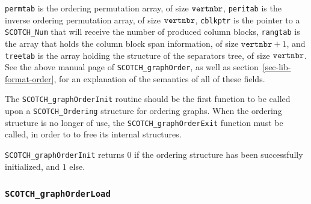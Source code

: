\begin{itemize}
{\tt permtab} is the ordering permutation array, of size ${\tt
vertnbr}$, {\tt peritab} is the inverse ordering permutation array,
of size ${\tt vertnbr}$, {\tt cblkptr} is the pointer to a
{\tt SCOTCH\_\lbt Num} that will receive the number of produced
column blocks, {\tt rangtab} is the array that holds the column block
span information, of size $\mathtt{vertnbr} + 1$, and {\tt treetab}
is the array holding the structure of the separators tree, of size
${\tt vertnbr}$. See the above manual page of
{\tt SCOTCH\_graph\lbt Order}, as well as
section~\ref{sec-lib-format-order}, for an explanation of the
semantics of all of these fields.

The {\tt SCOTCH\_\lbt graph\lbt Order\lbt Init} routine should be the
first function to be called upon a {\tt SCOTCH\_\lbt Ordering}
structure for ordering graphs. When the ordering structure is no
longer of use, the {\tt SCOTCH\_\lbt graph\lbt Order\lbt Exit}
function must be called, in order to to free its internal structures.

\progret

{\tt SCOTCH\_graphOrderInit} returns $0$ if the ordering structure has
been successfully initialized, and $1$ else.
\end{itemize}

\subsubsection{{\tt SCOTCH\_graphOrderLoad}}

